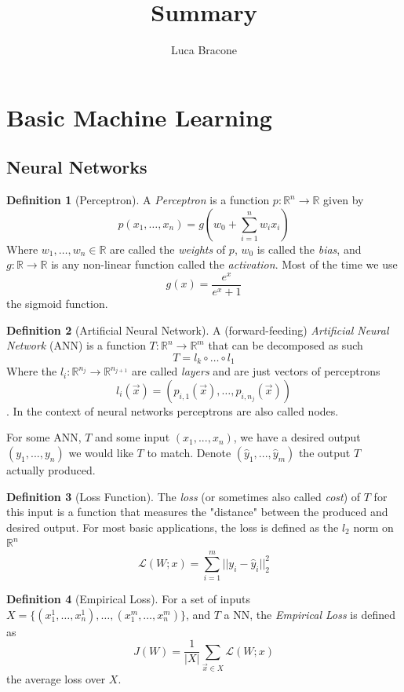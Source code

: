 \documentclass{article}
\title{Summary}
\author{Luca Bracone}
\newcommand{\R}{\mathbb{R}}
\theoremstyle{plain}
\theoremstyle{definition}
\newtheorem{definition}{Definition}[section]
\theoremstyle{remark}
\begin{document}
	\maketitle
	\section{Basic Machine Learning}
	\subsection{Neural Networks}
	\begin{definition}[Perceptron]
		A \emph{Perceptron} is a function $ p:\R^n \to \R $ given by 
		\[ p(x_1, \dots , x_n) = g \left( w_0 + \sum_{i=1}^{n} w_i x_i \right)  \]
		Where $ w_1, \dots, w_n \in \R $ are called the \emph{weights} of $p$, $w_0$ is called the \emph{bias}, and $g:\R \to \R $ is any non-linear function called the \emph{activation}.
		Most of the time we use \[ g(x)=\frac{e^x}{e^x+1} \] the sigmoid function.
	\end{definition}
	\begin{definition}[Artificial Neural Network]
		A (forward-feeding) \emph{Artificial Neural Network} (ANN) is a function $T: \R^n \to \R^m$ that can be decomposed as such \[ T= l_k \circ \dots \circ l_1  \] Where the $l_i : \R^{n_j} \to \R^{n_{j+1}}$ are called \emph{layers} and are just vectors of perceptrons \[ l_i(\vec{x})=(p_{i,1}(\vec{x}),\dots,p_{i,n_j}(\vec{x})) \].
		In the context of neural networks perceptrons are also called nodes.
	\end{definition}
For some ANN, $T$ and some input $ (x_1,...,x_n) $, we have a desired output $ (y_1,...,y_n) $ we would like $ T $ to match. Denote $ (\hat{y}_1,...,\hat{y}_m) $ the output $T$ actually produced.
\begin{definition}[Loss Function]
	 The \emph{loss} (or sometimes also called \emph{cost}) of $T$ for this input is a function that measures the "distance" between the produced and desired output. For most basic applications, the loss is defined as the $l_2$ norm on $\R^n$
	\[\mathcal{L}(W; x)= \sum_{i=1}^{m} ||y_i - \hat{y}_i||_2^2  \]
\end{definition}
\begin{definition}[Empirical Loss]
	For a set of inputs $X=\{(x_1^1,\dots,x_n^1), \dots , (x_1^m,\dots ,x_n^m)\}$, and $T$ a NN, the \emph{Empirical Loss} is defined as
	\[ J(W)=\frac{1}{|X|} \sum_{\vec{x}\in X} \mathcal{L}(W;x) \]
	the average loss over $X$.
\end{definition}
\end{document}
